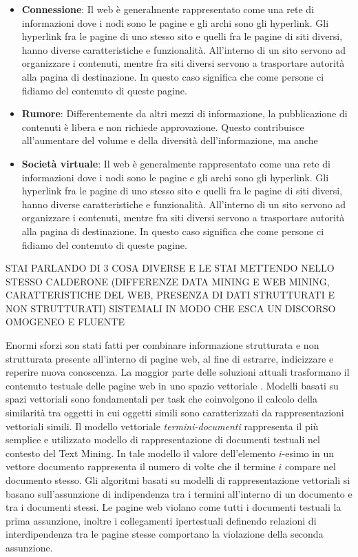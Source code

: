 \begin{itemize}
\item \textbf{Connessione}: Il web è generalmente rappresentato come una rete di informazioni dove i nodi sono le pagine e gli archi sono gli hyperlink. Gli hyperlink fra le pagine di uno stesso sito e quelli fra le pagine di siti diversi, hanno diverse caratteristiche e funzionalità. All'interno di un sito servono ad organizzare i contenuti, mentre fra siti diversi servono a trasportare autorità alla pagina di destinazione. In questo caso significa che come persone ci fidiamo del contenuto di queste pagine.

\item \textbf{Rumore}: 
Differentemente da altri mezzi di informazione, la pubblicazione di contenuti è libera e non richiede approvazione. Questo contribuisce all'aumentare del volume e della diversità dell'informazione, ma anche

\item \textbf{Società virtuale}: Il web è generalmente rappresentato come una rete di informazioni dove i nodi sono le pagine e gli archi sono gli hyperlink. Gli hyperlink fra le pagine di uno stesso sito e quelli fra le pagine di siti diversi, hanno diverse caratteristiche e funzionalità. All'interno di un sito servono ad organizzare i contenuti, mentre fra siti diversi servono a trasportare autorità alla pagina di destinazione. In questo caso significa che come persone ci fidiamo del contenuto di queste pagine.

\end{itemize}
\color{black}
STAI PARLANDO DI 3 COSA DIVERSE E LE STAI METTENDO NELLO STESSO CALDERONE (DIFFERENZE DATA MINING E WEB MINING, CARATTERISTICHE DEL WEB, PRESENZA DI DATI STRUTTURATI E NON STRUTTURATI)
SISTEMALI IN MODO CHE ESCA UN DISCORSO OMOGENEO E FLUENTE
\color{red}

Enormi sforzi son stati fatti per combinare informazione strutturata e non strutturata presente all'interno di pagine web, al fine di estrarre, indicizzare e reperire nuova conoscenza. 
La maggior parte delle soluzioni attuali trasformano il contenuto testuale delle pagine web in uno spazio vettoriale \cite{Turney10}. Modelli basati su spazi vettoriali sono fondamentali per task che coinvolgono il calcolo della similarità tra oggetti in cui oggetti simili sono caratterizzati da rappresentazioni vettoriali simili. Il modello vettoriale \textit{termini-documenti} rappresenta il più semplice e utilizzato modello di rappresentazione di documenti testuali nel contesto del Text Mining. In tale modello il valore dell'elemento $i$-esimo in un vettore documento rappresenta il numero di volte che il termine $i$ compare nel documento stesso.    
Gli algoritmi basati su modelli di rappresentazione vettoriali si basano sull'assunzione di indipendenza tra i termini all'interno di un documento e tra i documenti stessi. Le pagine web violano come tutti i documenti testuali la prima assunzione, inoltre i collegamenti ipertestuali definendo relazioni di interdipendenza tra le pagine stesse comportano la violazione della seconda assunzione.

